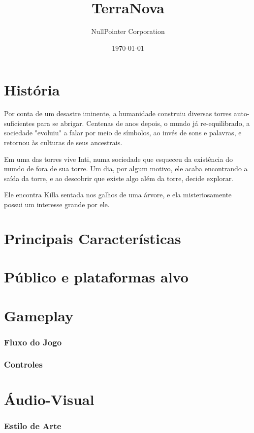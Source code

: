 \documentclass[11pt]{article}
\begin{document}
\title{TerraNova}
\author{NullPointer Corporation}
\date{\today}
\maketitle

\newpage

\tableofcontents
\newpage
\part{História}

Por conta de um desastre iminente, a humanidade construiu diversas torres auto-suficientes para se abrigar.
Centenas de anos depois, o mundo já re-equilibrado, a sociedade "evoluiu" a falar por meio de símbolos, ao invés de sons e palavras, e retornou às culturas de seus ancestrais.

Em uma das torres vive Inti, numa sociedade que esqueceu da existência do mundo de fora de sua torre.
Um dia, por algum motivo, ele acaba encontrando a saída da torre, e ao descobrir que existe algo além da torre, decide explorar.

Ele encontra Killa sentada nos galhos de uma árvore, e ela misteriosamente possui um interesse grande por ele.
\newpage
\part{Principais Características}
\newpage
\part{Público e plataformas alvo}
\newpage
\part{Gameplay}
\section{Fluxo do Jogo}
 
\section{Controles}
\newpage 
\part{Áudio-Visual}
\section{Estilo de Arte}
 
\end{document}

